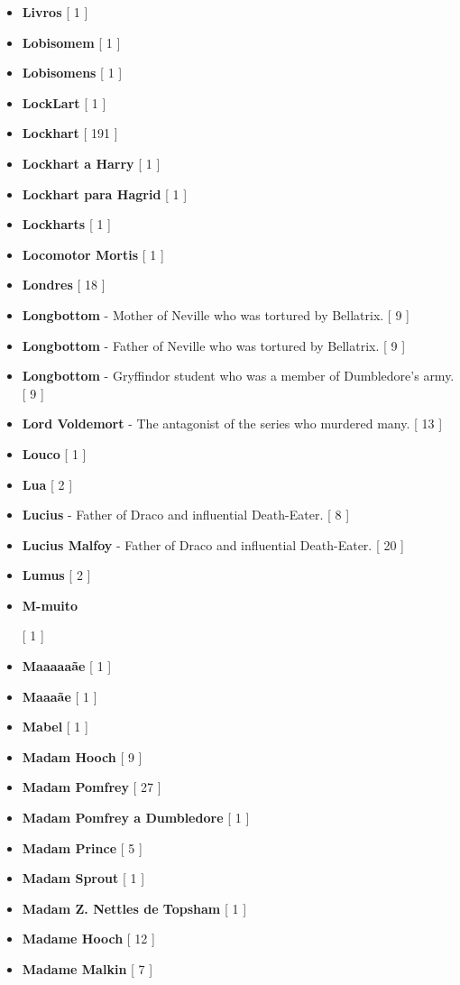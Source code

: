 \documentclass[a4paper]{article}
\begin{document}
\begin{itemize}
	\item \textbf{Livros} [ 1 ]
	\item \textbf{Lobisomem} [ 1 ]
	\item \textbf{Lobisomens} [ 1 ]
	\item \textbf{LockLart} [ 1 ]
	\item \textbf{Lockhart} [ 191 ]
	\item \textbf{Lockhart a Harry} [ 1 ]
	\item \textbf{Lockhart para Hagrid} [ 1 ]
	\item \textbf{Lockharts} [ 1 ]
	\item \textbf{Locomotor Mortis} [ 1 ]
	\item \textbf{Londres} [ 18 ]
	\item \textbf{Longbottom} - Mother of Neville who was tortured by Bellatrix. [ 9 ]
	\item \textbf{Longbottom} - Father of Neville who was tortured by Bellatrix. [ 9 ]
	\item \textbf{Longbottom} - Gryffindor student who was a member of Dumbledore's army. [ 9 ]
	\item \textbf{Lord Voldemort} - The antagonist of the series who murdered many. [ 13 ]
	\item \textbf{Louco} [ 1 ]
	\item \textbf{Lua} [ 2 ]
	\item \textbf{Lucius} - Father of Draco and influential Death-Eater. [ 8 ]
	\item \textbf{Lucius Malfoy} - Father of Draco and influential Death-Eater. [ 20 ]
	\item \textbf{Lumus} [ 2 ]
	\item \hypertarget{M}{\textbf{M-muito}} [ 1 ]
	\item \textbf{Maaaaaãe} [ 1 ]
	\item \textbf{Maaaãe} [ 1 ]
	\item \textbf{Mabel} [ 1 ]
	\item \textbf{Madam Hooch} [ 9 ]
	\item \textbf{Madam Pomfrey} [ 27 ]
	\item \textbf{Madam Pomfrey a Dumbledore} [ 1 ]
	\item \textbf{Madam Prince} [ 5 ]
	\item \textbf{Madam Sprout} [ 1 ]
	\item \textbf{Madam Z. Nettles de Topsham} [ 1 ]
	\item \textbf{Madame Hooch} [ 12 ]
	\item \textbf{Madame Malkin} [ 7 ]

\end{itemize}
\end{document}
